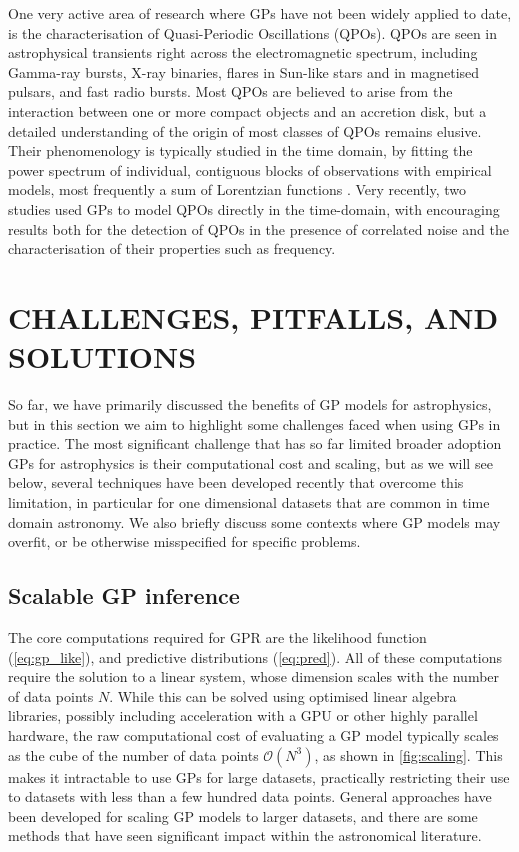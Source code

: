 \documentclass[letterpaper]{ar-1col}
\begin{document}
One very active area of research where GPs have not been widely applied to date, is the characterisation of Quasi-Periodic Oscillations (QPOs). QPOs are seen in astrophysical transients right across the electromagnetic spectrum, including Gamma-ray bursts, X-ray binaries, flares in Sun-like stars and in magnetised pulsars, and fast radio bursts. Most QPOs are believed to arise from the interaction between one or more compact objects and an accretion disk, but a detailed understanding of the origin of most classes of QPOs remains elusive. Their phenomenology is typically studied in the time domain, by fitting the power spectrum of individual, contiguous blocks of observations with empirical models, most frequently a sum of Lorentzian functions \citep[see][and references therein]{ingram_motta_QPOs}. Very recently, two studies \citep{2021ApJ...907..105Y, 2022ApJ...936...17H} used GPs to model QPOs directly in the time-domain, with encouraging results both for the detection of QPOs in the presence of correlated noise and the characterisation of their properties such as frequency.

\section{CHALLENGES, PITFALLS, AND SOLUTIONS}
\label{sec:challenges}

So far, we have primarily discussed the benefits of GP models for astrophysics, but in this section we aim to highlight some challenges faced when using GPs in practice.
The most significant challenge that has so far limited broader adoption GPs for astrophysics is their computational cost and scaling, but as we will see below, several techniques have been developed recently that overcome this limitation, in particular for one dimensional datasets that are common in time domain astronomy.
We also briefly discuss some contexts where GP models may overfit, or be otherwise misspecified for specific problems.

\subsection{Scalable GP inference}
\label{sec:fast}

The core computations required for GPR are the likelihood function (\autoref{eq:gp_like}), and predictive distributions (\autoref{eq:pred}).
All of these computations require the solution to a linear system, whose dimension scales with the number of data points $N$.
While this can be solved using optimised linear algebra libraries, possibly including acceleration with a GPU or other highly parallel hardware, the raw computational cost of evaluating a GP model typically scales as the cube of the number of data points $\mathcal{O}(N^3)$, as shown in \autoref{fig:scaling}.
This makes it intractable to use GPs for large datasets, practically restricting their use to datasets with less than a few hundred data points.
General approaches have been developed for scaling GP models to larger datasets, and there are some methods that have seen significant impact within the astronomical literature.
\end{document}

